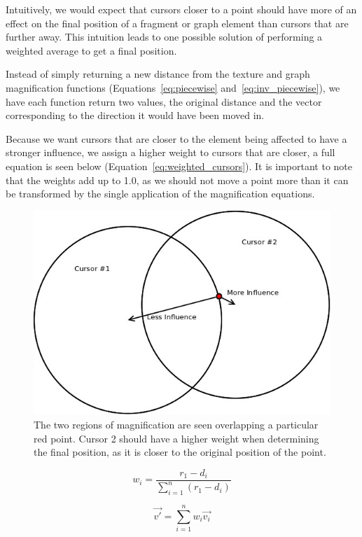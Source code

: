 Intuitively, we would expect that cursors closer to a point should have more of an effect on the final
position of a fragment or graph element than cursors that are further away. This intuition leads to one possible
solution of performing a weighted average to get a final position.

Instead of simply returning a new distance from the texture and graph magnification functions 
(Equations~\ref{eq:piecewise} and~\ref{eq:inv_piecewise}), we have each function return two values, 
the original distance and the vector corresponding to the direction it would have been moved in. 

Because we want cursors that are closer to the element being affected to have a stronger influence, we
assign a higher weight to cursors that are closer, a full equation is seen below 
(Equation~\ref{eq:weighted_cursors}). It is important to note that the weights add up to 1.0, as we should not
move a point more than it can be transformed by the single application of the magnification equations.

\begin{figure}[htp] \centering
    \includegraphics[width=0.6\linewidth]{img/multi_cursor.jpg}
    \caption[Multiple Cursor Magnification]{The two regions of magnification are seen overlapping a particular red point. Cursor 2 should have a higher weight when determining the final position, as it is closer to the original position of the point.}
    \label{fig:multi_cursor}
\end{figure}

\begin{equation}
    \label{eq:weighted_cursors}
    w_i = \frac{r_1 - d_i}{\sum\limits_{i=1}^n (r_1 - d_i)}
\end{equation}

\begin{equation}
    \label{eq:weighted_sum}
    \vec{v'} = \sum\limits_{i=1}^n w_i \vec{v_i}
\end{equation}

